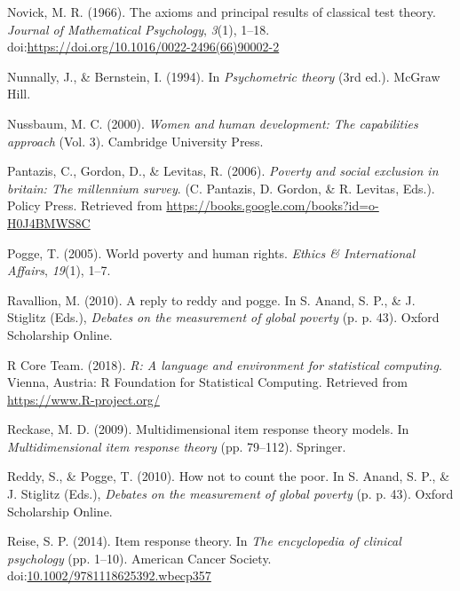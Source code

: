 \documentclass[]{book}
\begin{document}
\leavevmode\hypertarget{ref-Novick1966}{}%
Novick, M. R. (1966). The axioms and principal results of classical test theory. \emph{Journal of Mathematical Psychology}, \emph{3}(1), 1--18. doi:\href{https://doi.org/https://doi.org/10.1016/0022-2496(66)90002-2}{https://doi.org/10.1016/0022-2496(66)90002-2}

\leavevmode\hypertarget{ref-Nunnally1994}{}%
Nunnally, J., \& Bernstein, I. (1994). In \emph{Psychometric theory} (3rd ed.). McGraw Hill.

\leavevmode\hypertarget{ref-Nussbaum2000}{}%
Nussbaum, M. C. (2000). \emph{Women and human development: The capabilities approach} (Vol. 3). Cambridge University Press.

\leavevmode\hypertarget{ref-Pantazis2006a}{}%
Pantazis, C., Gordon, D., \& Levitas, R. (2006). \emph{Poverty and social exclusion in britain: The millennium survey}. (C. Pantazis, D. Gordon, \& R. Levitas, Eds.). Policy Press. Retrieved from \url{https://books.google.com/books?id=o-H0J4BMWS8C}

\leavevmode\hypertarget{ref-Pogge2005a}{}%
Pogge, T. (2005). World poverty and human rights. \emph{Ethics \& International Affairs}, \emph{19}(1), 1--7.

\leavevmode\hypertarget{ref-Ravallion2010}{}%
Ravallion, M. (2010). A reply to reddy and pogge. In S. Anand, S. P., \& J. Stiglitz (Eds.), \emph{Debates on the measurement of global poverty} (p. p. 43). Oxford Scholarship Online.

\leavevmode\hypertarget{ref-RCT2018}{}%
R Core Team. (2018). \emph{R: A language and environment for statistical computing}. Vienna, Austria: R Foundation for Statistical Computing. Retrieved from \url{https://www.R-project.org/}

\leavevmode\hypertarget{ref-Reckase2009}{}%
Reckase, M. D. (2009). Multidimensional item response theory models. In \emph{Multidimensional item response theory} (pp. 79--112). Springer.

\leavevmode\hypertarget{ref-Reddy2010}{}%
Reddy, S., \& Pogge, T. (2010). How not to count the poor. In S. Anand, S. P., \& J. Stiglitz (Eds.), \emph{Debates on the measurement of global poverty} (p. p. 43). Oxford Scholarship Online.

\leavevmode\hypertarget{ref-Reise2014}{}%
Reise, S. P. (2014). Item response theory. In \emph{The encyclopedia of clinical psychology} (pp. 1--10). American Cancer Society. doi:\href{https://doi.org/10.1002/9781118625392.wbecp357}{10.1002/9781118625392.wbecp357}
\end{document}
